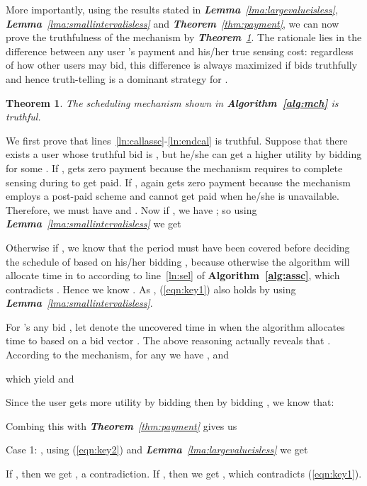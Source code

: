 \documentclass[10pt,journal,compsoc]{IEEEtran}
\newtheorem{theorem}{\textbf{Theorem}}
\begin{document}
  More importantly, using the results stated in \textit{\textbf{Lemma}~\ref{lma:largevalueisless}}, \textit{\textbf{Lemma}~\ref{lma:smallintervalisless}} and \textit{\textbf{Theorem}~\ref{thm:payment}}, we can now prove the truthfulness of the mechanism by \textit{\textbf{Theorem}~\ref{thm:truthful}}. The rationale lies in the difference between any user 's payment and his/her true sensing cost: regardless of how other users may bid, this difference is always maximized if  bids truthfully and hence truth-telling is a dominant strategy for .


  \begin{theorem}
    The scheduling mechanism shown in \textbf{Algorithm~\ref{alg:mch}} is truthful.\label{thm:truthful}
  \end{theorem}
\begin{IEEEproof}
    We first prove that lines~\ref{ln:callassc}-\ref{ln:endcal} is truthful. Suppose that there exists a user  whose truthful bid is , but he/she can get a higher utility by bidding  for some . If ,  gets zero payment because the mechanism requires  to complete sensing during   to get paid. If ,  again gets zero payment because the mechanism employs a post-paid scheme and  cannot get paid when he/she is unavailable. Therefore, we must have   and . Now if , we have ; so using \textit{\textbf{Lemma}~\ref{lma:smallintervalisless}} we get

Otherwise if , we know that the period  must have been covered before deciding the schedule of  based on his/her bidding , because otherwise the algorithm will allocate time in  to  according to line~\ref{ln:sel} of \textbf{Algorithm~\ref{alg:assc}}, which contradicts . Hence we know . As , (\ref{eqn:key1}) also holds by using \textit{\textbf{Lemma}~\ref{lma:smallintervalisless}}.

    For 's any bid , let  denote the uncovered time in  when the algorithm allocates time to  based on a bid vector . The above reasoning actually reveals that . According to the mechanism, for any  we have ,  and

which yield  and

Since the user gets more utility by bidding  then by bidding , we know that:

Combing this with \textit{\textbf{Theorem}~\ref{thm:payment}} gives us


    Case 1: , using (\ref{eqn:key2}) and \textit{\textbf{Lemma}~\ref{lma:largevalueisless}} we get

If , then we get , a contradiction. If , then we get , which contradicts (\ref{eqn:key1}).


\end{IEEEproof}
\end{document}
